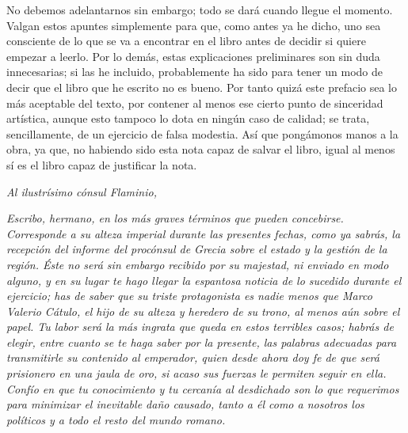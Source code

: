 \documentclass[11pt,openany]{book}
\begin{document}
No debemos adelantarnos sin embargo; todo se dará cuando llegue el momento. Valgan estos apuntes simplemente para que, como antes ya he dicho, uno sea consciente de lo que se va a encontrar en el libro antes de decidir si quiere empezar a leerlo. Por lo demás, estas explicaciones preliminares son sin duda innecesarias; si las he incluido, probablemente ha sido para tener un modo de decir que el libro que he escrito no es bueno. Por tanto quizá este prefacio sea lo más aceptable del texto, por contener al menos ese cierto punto de sinceridad artística, aunque esto tampoco lo dota en ningún caso de calidad; se trata, sencillamente, de un ejercicio de falsa modestia. Así que pongámonos manos a la obra, ya que, no habiendo sido esta nota capaz de salvar el libro, igual al menos sí es el libro capaz de justificar la nota.
 

\mainmatter
\small
\textit{Al ilustrísimo cónsul Flaminio,}

\textit{Escribo, hermano, en los más graves términos que pueden concebirse. Corresponde a su alteza imperial durante las presentes fechas, como ya sabrás, la recepción del informe del procónsul de Grecia sobre el estado y la gestión de la región. Éste no será sin embargo recibido por su majestad, ni enviado en modo alguno, y en su lugar te hago llegar la espantosa noticia de lo sucedido durante el ejercicio; has de saber que su triste protagonista es nadie menos que Marco Valerio Cátulo, el hijo de su alteza y heredero de su trono, al menos aún sobre el papel. Tu labor será la más ingrata que queda en estos terribles casos; habrás de elegir, entre cuanto se te haga saber por la presente, las palabras adecuadas para transmitirle su contenido al emperador, quien desde ahora doy fe de que será prisionero en una jaula de oro, si acaso sus fuerzas le permiten seguir en ella. Confío en que tu conocimiento y tu cercanía al desdichado son lo que requerimos para minimizar el inevitable daño causado, tanto a él como a nosotros los políticos y a todo el resto del mundo romano.}
\end{document}
